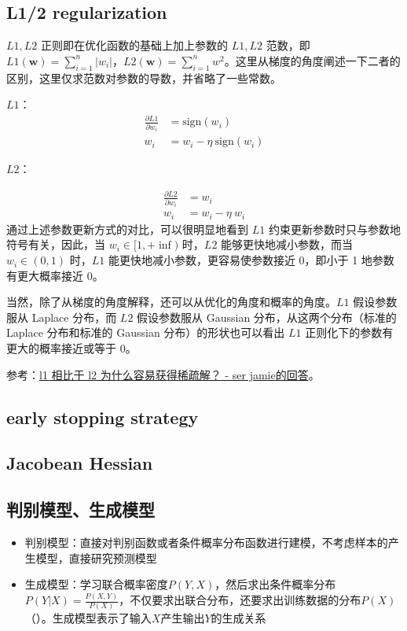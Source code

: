 
\subsection{L1/2 regularization}
$L1, L2$ 正则即在优化函数的基础上加上参数的 $L1, L2$ 范数，即 $L1(\boldsymbol{w}) = \sum_{i=1}^{n} |w_i|$，$L2(\boldsymbol{w}) = \sum_{i=1}^{n} w^2$。这里从梯度的角度阐述一下二者的区别，这里仅求范数对参数的导数，并省略了一些常数。

$L1$：
$$
\begin{aligned}
	\frac{\partial L1}{\partial w_i} &=  \text{sign}(w_i) \\
	w_i &= w_i - \eta\ \text{sign}(w_i)	
\end{aligned}
$$

$L2$：

$$
\begin{aligned}
	\frac{\partial L2}{\partial w_i} &=  w_i \\
	w_i &= w_i - \eta\ w_i
\end{aligned}
$$
通过上述参数更新方式的对比，可以很明显地看到 $L1$ 约束更新参数时只与参数地符号有关，因此，当 $w_i \in [1, +\inf)$ 时，$L2$ 能够更快地减小参数，而当 $w_i \in (0, 1)$ 时，$L1$ 能更快地减小参数，更容易使参数接近 0，即小于 1 地参数有更大概率接近 0。

当然，除了从梯度的角度解释，还可以从优化的角度和概率的角度。$L1$ 假设参数服从 Laplace 分布，而 $L2$ 假设参数服从 Gaussian 分布，从这两个分布（标准的 Laplace 分布和标准的 Gaussian 分布）的形状也可以看出 $L1$ 正则化下的参数有更大的概率接近或等于 0。

参考：\href{https://www.zhihu.com/question/37096933/answer/475278057}{l1 相比于 l2 为什么容易获得稀疏解？ - ser jamie的回答}。



\subsection{early stopping strategy}

\subsection{Jacobean Hessian}

\subsection{判别模型、生成模型}
\begin{itemize}
	\item 判别模型：直接对判别函数或者条件概率分布函数进行建模，不考虑样本的产生模型，直接研究预测模型
	\item 生成模型：学习联合概率密度$P(Y, X)$，然后求出条件概率分布$P(Y|X) = \frac{P(X, Y)}{P(X)}$，不仅要求出联合分布，还要求出训练数据的分布$P(X)$（{\color{red}{不一定要计算$p(X)$，因为对于同一个样本，计算它属于不同分类时，其$p(X)$是一样的，对判别没有帮助}}）。生成模型表示了输入$X$产生输出$Y$的生成关系
\end{itemize}

